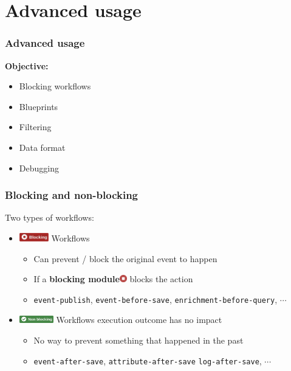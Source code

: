 \section{Advanced usage}
\begin{frame}
    \frametitle{
        \huge
        Advanced usage
        \vspace{1em}
    }
    \textbf{Objective:}
    \begin{itemize}
        \item Blocking workflows
        \item Blueprints
        \item Filtering
        \item Data format
        \item Debugging
    \end{itemize}
\end{frame}

\begin{frame}
    \frametitle{Blocking and non-blocking}
    Two types of workflows:
    \vspace{0.5em}
    \begin{itemize}
        \item[] \hspace*{-2em}\includegraphics[valign=m,width=48px]{pictures/blocking-workflow.png} Workflows
        \begin{itemize}
            \item Can prevent / block the original event to happen
            \item If a \textbf{blocking module}\includegraphics[valign=b,width=12px]{pictures/blocking-module.png} blocks the action
            \item \texttt{event-publish}, \texttt{event-before-save}, \texttt{enrichment-before-query}, $\cdots$
        \end{itemize}
        \vspace{0.5em}
        \item[] \hspace*{-2em}\includegraphics[valign=b,width=56px]{pictures/non-blocking-workflow.png} Workflows execution outcome has no impact
        \begin{itemize}
            \item No way to prevent something that happened in the past
            \item \texttt{event-after-save}, \texttt{attribute-after-save} \texttt{log-after-save}, $\cdots$
        \end{itemize}
    \end{itemize}
\end{frame}

